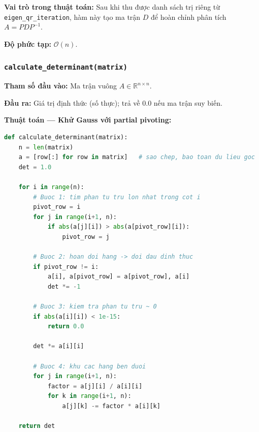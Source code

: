 \documentclass[a4paper,12pt]{report}
\begin{document}
\smallskip

\textbf{Vai trò trong thuật toán:} Sau khi thu được danh sách trị riêng từ \texttt{eigen\_qr\_iteration}, hàm này tạo ma trận $D$ để hoàn chỉnh phân tích $A = P D P^{-1}$.

\smallskip

\textbf{Độ phức tạp:} $\mathcal{O}(n)$.

\subsubsection*{\texttt{calculate\_determinant(matrix)}}

\smallskip

\textbf{Tham số đầu vào:} Ma trận vuông $A \in \mathbb{R}^{n \times n}$.

\smallskip

\textbf{Đầu ra:} Giá trị định thức (số thực); trả về $0.0$ nếu ma trận suy biến.

\smallskip

\textbf{Thuật toán --- Khử Gauss với partial pivoting:}

\begin{lstlisting}[language=Python, caption={Tính định thức bằng khử Gauss}]
def calculate_determinant(matrix):
    n = len(matrix)
    a = [row[:] for row in matrix]   # sao chep, bao toan du lieu goc
    det = 1.0

    for i in range(n):
        # Buoc 1: tim phan tu tru lon nhat trong cot i
        pivot_row = i
        for j in range(i+1, n):
            if abs(a[j][i]) > abs(a[pivot_row][i]):
                pivot_row = j

        # Buoc 2: hoan doi hang -> doi dau dinh thuc
        if pivot_row != i:
            a[i], a[pivot_row] = a[pivot_row], a[i]
            det *= -1

        # Buoc 3: kiem tra phan tu tru ~ 0
        if abs(a[i][i]) < 1e-15:
            return 0.0

        det *= a[i][i]

        # Buoc 4: khu cac hang ben duoi
        for j in range(i+1, n):
            factor = a[j][i] / a[i][i]
            for k in range(i+1, n):
                a[j][k] -= factor * a[i][k]

    return det
\end{lstlisting}
\end{document}
